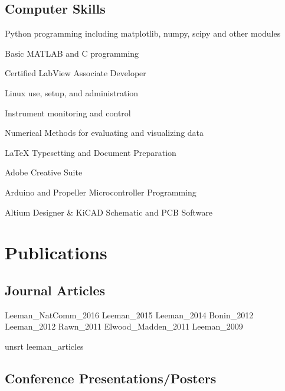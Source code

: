 \documentclass[letterpaper]{article}
\renewenvironment{itemize}{
  \begin{list}{}{
    \setlength{\leftmargin}{1.5em}
  }
}{
  \end{list}
}
\begin{document}
\subsection*{Computer Skills}

\begin{itemize}
\item Python programming including matplotlib, numpy, scipy and other modules
\item Basic MATLAB and C programming
\item Certified LabView Associate Developer
\item Linux use, setup, and administration
\item Instrument monitoring and control
\item Numerical Methods for evaluating and visualizing data
\item \LaTeX{} Typesetting and Document Preparation
\item Adobe Creative Suite
\item Arduino and Propeller Microcontroller Programming
\item Altium Designer \& KiCAD Schematic and PCB Software
\end{itemize}



\section*{Publications}



\subsection*{Journal Articles}

\begingroup
\renewcommand{\section}[2]{}

\nocite{journal}{Leeman_NatComm_2016}
\nocite{journal}{Leeman_2015}
\nocite{journal}{Leeman_2014}
\nocite{journal}{Bonin_2012}
\nocite{journal}{Leeman_2012}
\nocite{journal}{Rawn_2011}
\nocite{journal}{Elwood_Madden_2011}
\nocite{journal}{Leeman_2009}

{unsrt}
{leeman_articles}{}
\endgroup

\subsection*{Conference Presentations/Posters}
\end{document}
